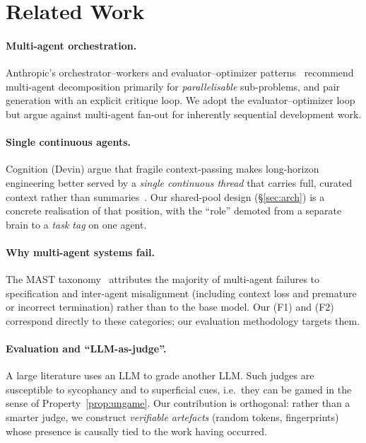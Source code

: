 \documentclass[10pt,twocolumn]{article}
\begin{document}
\section{Related Work}\label{sec:related}
\paragraph{Multi-agent orchestration.}
Anthropic's orchestrator--workers and evaluator--optimizer
patterns~\cite{anthropic} recommend multi-agent decomposition primarily for
\emph{parallelisable} sub-problems, and pair generation with an explicit
critique loop. We adopt the evaluator--optimizer loop but argue against
multi-agent fan-out for inherently sequential development work.

\paragraph{Single continuous agents.}
Cognition (Devin) argue that fragile context-passing makes long-horizon
engineering better served by a \emph{single continuous thread} that carries
full, curated context rather than summaries~\cite{cognition}. Our shared-pool
design (\S\ref{sec:arch}) is a concrete realisation of that position, with the
``role'' demoted from a separate brain to a \emph{task tag} on one agent.

\paragraph{Why multi-agent systems fail.}
The MAST taxonomy~\cite{mast} attributes the majority of multi-agent failures
to specification and inter-agent misalignment (including context loss and
premature or incorrect termination) rather than to the base model. Our (F1)
and (F2) correspond directly to these categories; our evaluation methodology
targets them.

\paragraph{Evaluation and ``LLM-as-judge''.}
A large literature uses an LLM to grade another LLM. Such judges are
susceptible to sycophancy and to superficial cues, i.e.\ they can be gamed in
the sense of Property~\ref{prop:ungame}. Our contribution is orthogonal: rather
than a smarter judge, we construct \emph{verifiable artefacts} (random tokens,
fingerprints) whose presence is causally tied to the work having occurred.
\end{document}
